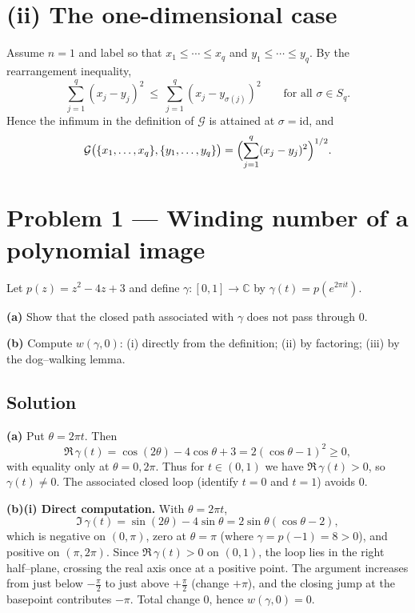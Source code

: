 \documentclass[12pt,a4paper]{article}
\theoremstyle{plain}
\theoremstyle{definition}
\theoremstyle{remark}
\theoremstyle{remark}
\begin{document}
\bigskip

\section*{(ii) The one-dimensional case}

Assume $n=1$ and label so that $x_1\le\cdots\le x_q$ and $y_1\le\cdots\le y_q$.
By the rearrangement inequality,
\[
\sum_{j=1}^{q}(x_j-y_j)^2 \ \le\ \sum_{j=1}^{q}(x_j-y_{\sigma(j)})^2
\qquad\text{for all }\sigma\in S_q.
\]
Hence the infimum in the definition of $\mathcal{G}$ is attained at $\sigma=\mathrm{id}$, and
\[
\mathcal{G}\bigl(\{x_1,\dots,x_q\},\{y_1,\dots,y_q\}\bigr)
=\Bigl(\sum_{j=1}^{q}(x_j-y_j)^2\Bigr)^{1/2}.
\]

\section*{Problem 1 — Winding number of a polynomial image}

Let $p(z)=z^{2}-4z+3$ and define $\gamma:[0,1]\to\mathbb C$ by $\gamma(t)=p(e^{2\pi i t})$.

\smallskip

\noindent\textbf{(a)} Show that the closed path associated with $\gamma$ does not pass through $0$.

\noindent\textbf{(b)} Compute $w(\gamma,0)$:
(i) directly from the definition; (ii) by factoring; (iii) by the dog–walking lemma.

\bigskip

\subsection*{Solution}

\noindent\textbf{(a)} Put $\theta=2\pi t$. Then
\[
\Re\,\gamma(t)=\cos(2\theta)-4\cos\theta+3
=2(\cos\theta-1)^2\ge 0,
\]
with equality only at $\theta=0,2\pi$. Thus for $t\in(0,1)$ we have $\Re\,\gamma(t)>0$, so
$\gamma(t)\ne 0$. The associated closed loop (identify $t=0$ and $t=1$) avoids $0$.

\smallskip

\noindent\textbf{(b)(i) Direct computation.}
With $\theta=2\pi t$,
\[
\Im\,\gamma(t)=\sin(2\theta)-4\sin\theta
=2\sin\theta(\cos\theta-2),
\]
which is negative on $(0,\pi)$, zero at $\theta=\pi$ (where $\gamma=\!p(-1)=8>0$), and positive on
$(\pi,2\pi)$. Since $\Re\,\gamma(t)>0$ on $(0,1)$, the loop lies in the right half–plane,
crossing the real axis once at a positive point. The argument increases from just below
$-\frac{\pi}{2}$ to just above $+\frac{\pi}{2}$ (change $+\pi$), and the closing jump at the basepoint
contributes $-\pi$. Total change $0$, hence $w(\gamma,0)=0$.
\end{document}
